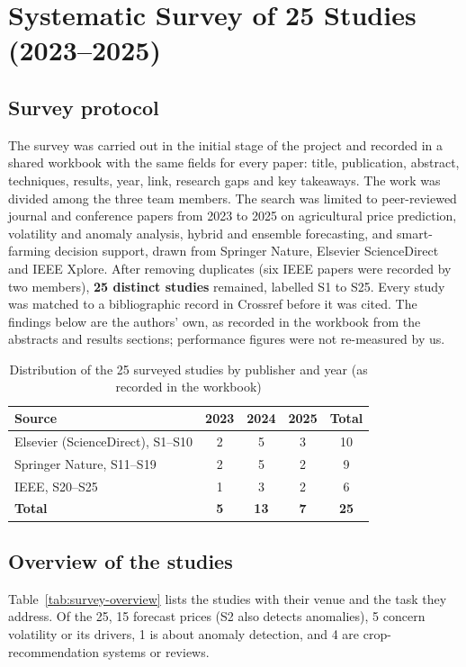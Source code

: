 \section{Systematic Survey of 25 Studies (2023--2025)}
\label{sec:survey}

\subsection{Survey protocol}
The survey was carried out in the initial stage of the project and recorded in a shared workbook with the same fields for every paper: title, publication, abstract, techniques, results, year, link, research gaps and key takeaways. The work was divided among the three team members. The search was limited to peer-reviewed journal and conference papers from 2023 to 2025 on agricultural price prediction, volatility and anomaly analysis, hybrid and ensemble forecasting, and smart-farming decision support, drawn from Springer Nature, Elsevier ScienceDirect and IEEE Xplore. After removing duplicates (six IEEE papers were recorded by two members), \textbf{25 distinct studies} remained, labelled S1 to S25. Every study was matched to a bibliographic record in Crossref before it was cited. The findings below are the authors' own, as recorded in the workbook from the abstracts and results sections; performance figures were not re-measured by us.

\begin{table}[!t]
\centering
\caption{Distribution of the 25 surveyed studies by publisher and year (as recorded in the workbook)}
\label{tab:survey-dist}
\small
\begin{tabular}{|l|c|c|c|c|}
\hline
\textbf{Source} & \textbf{2023} & \textbf{2024} & \textbf{2025} & \textbf{Total} \\ \hline
Elsevier (ScienceDirect), S1--S10 & 2 & 5 & 3 & 10 \\ \hline
Springer Nature, S11--S19 & 2 & 5 & 2 & 9 \\ \hline
IEEE, S20--S25 & 1 & 3 & 2 & 6 \\ \hline
\textbf{Total} & \textbf{5} & \textbf{13} & \textbf{7} & \textbf{25} \\ \hline
\end{tabular}
\end{table}

\subsection{Overview of the studies}
Table~\ref{tab:survey-overview} lists the studies with their venue and the task they address. Of the 25, 15 forecast prices (S2 also detects anomalies), 5 concern volatility or its drivers, 1 is about anomaly detection, and 4 are crop-recommendation systems or reviews.

